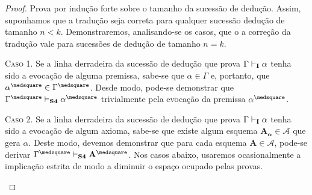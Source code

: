     \begin{proof}
        Prova por indução forte sobre o tamanho da sucessão de dedução.
        Assim, suponhamos que a tradução seja correta para qualquer sucessão dedução de tamanho $n<k$.
        Demonstraremos, analisando-se os casos, que o a correção da tradução vale para sucessões de dedução de tamanho $n=k$.

        \begin{case}
            \textsc{Caso 1.}
            Se a linha derradeira da sucessão de dedução que prova $\Gamma\mathrel{\vdash}_\mathbf{I}\alpha$ tenha sido a evocação de alguma premissa, sabe-se que $\alpha\in\Gamma$ e, portanto, que $\alpha^\medsquare\in\Gamma^\medsquare$. Desde modo, pode-se demonstrar que $\Gamma^\medsquare\entails_\mathbf{S4}\alpha^\medsquare$ trivialmente pela evocação da premissa $\alpha^\medsquare$.
        \end{case}

        \begin{case}
            \textsc{Caso 2.}
            Se a linha derradeira da sucessão de dedução que prova $\Gamma\mathrel{\vdash}_\mathbf{I}\alpha$ tenha sido a evocação de algum axioma, sabe-se que existe algum esquema $\mathbf{A_\alpha}\in\mathcal{A}$ que gera $\alpha$. Deste modo, devemos demonstrar que para cada esquema $\mathbf{A}\in\mathcal{A}$, pode-se derivar $\Gamma^\medsquare\entails_\mathbf{S4}\mathbf{A}^\medsquare$. Nos casos abaixo, usaremos ocasionalmente a implicação estrita de modo a diminuir o espaço ocupado pelas provas.
        \end{case}


\end{proof}
